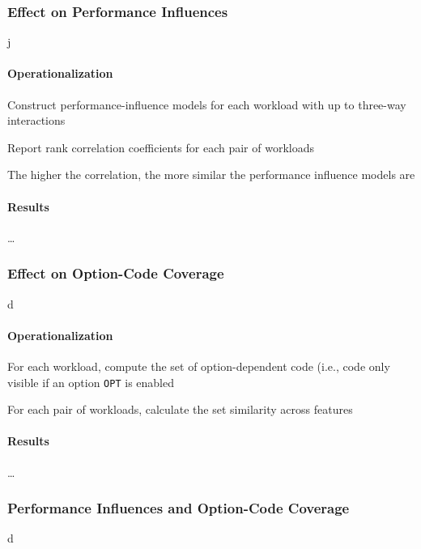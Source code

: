 \subsubsection{Effect on Performance Influences} j


{\color{blue}
\paragraph{Operationalization} 

\begin{compactitem}
	\item Construct performance-influence models for each workload with up to three-way interactions
	\item Report rank correlation coefficients for each pair of workloads
	\item The higher the correlation, the more similar the performance influence models are
\end{compactitem}

\paragraph{Results} \ldots
}

\subsubsection{Effect on Option-Code Coverage} d

{\color{blue}
\paragraph{Operationalization} 

\begin{compactitem}
	\item For each workload, compute the set of option-dependent code (i.e., code only visible if an option \texttt{OPT} is enabled
	\item For each pair of workloads, calculate the set similarity across features
\end{compactitem}

\paragraph{Results} \ldots
}
\subsubsection{Performance Influences and Option-Code Coverage} d

